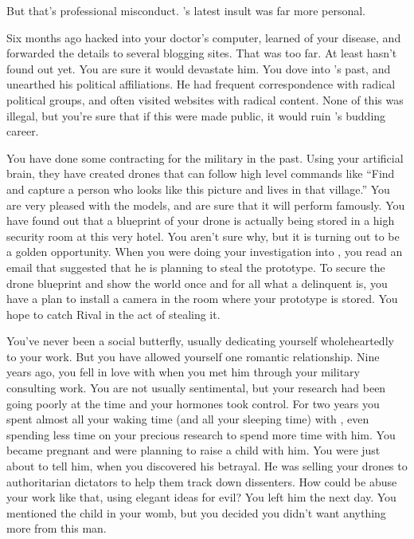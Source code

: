 \documentclass[char]{guildcamp1}
\begin{document}
But that's professional misconduct. \cRival{}'s latest insult was far more personal.

Six months ago \cRival{} hacked into your doctor's computer, learned of your disease, and forwarded the details to several blogging sites. That was too far. At least \cKid{} hasn't found out yet. You are sure it would devastate him. You dove into \cRival{}'s past, and unearthed his political affiliations. He had frequent correspondence with radical political groups, and often visited websites with radical content. None of this was illegal, but you're sure that if this were made public, it would ruin \cRival{}'s budding career.

You have done some contracting for the military in the past.  Using your artificial brain, they have created drones that can follow high level commands like ``Find and capture a person who looks like this picture and lives in that village.''  You are very pleased with the models, and are sure that it will perform famously. You have found out that a blueprint of your drone is actually being stored in a high security room at this very hotel. You aren't sure why, but it is turning out to be a golden opportunity.  When you were doing your investigation into \cRival{}, you read an email that suggested that he is planning to steal the prototype.  To secure the drone blueprint and show the world once and for all what a delinquent \cRival{} is, you have a plan to install a camera in the room where your prototype is stored.  You hope to catch Rival in the act of stealing it.

You've never been a social butterfly, usually dedicating yourself wholeheartedly to your work. But you have allowed yourself one romantic relationship.  Nine years ago, you fell in love with \cGroomA{\intro{}} when you met him through your military consulting work.  You are not usually sentimental, but your research had been going poorly at the time and your hormones took control. For two years you spent almost all your waking time (and all your sleeping time) with \cGroomA{}, even spending less time on your precious research to spend more time with him.  You became pregnant and were planning to raise a child with him. You were just about to tell him, when you discovered his betrayal.  He was selling your drones to authoritarian dictators to help them track down dissenters.  How could be abuse your work like that, using elegant ideas for evil?  You left him the next day.  You mentioned the child in your womb, but you decided you didn't want anything more from this man.
 
\end{document}
